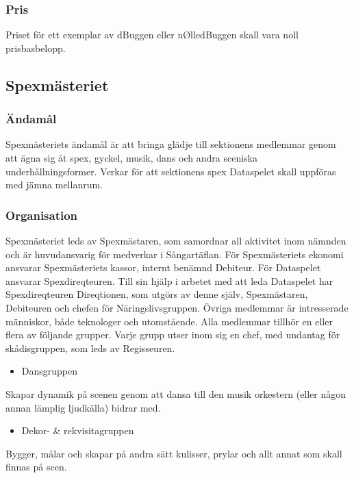 \documentclass[a4paper,12pt]{article}
\begin{document}
\subsubsection{Pris}

Priset för ett exemplar av dBuggen eller nØlledBuggen skall vara noll prisbasbelopp.

\subsection{Spexmästeriet}

\subsubsection{Ändamål}

Spexmästeriets ändamål är att bringa glädje till sektionens medlemmar genom att ägna sig åt spex, gyckel, musik, dans och andra sceniska underhållningsformer. Verkar för att sektionens spex Dataspelet skall uppföras med jämna mellanrum.

\subsubsection{Organisation}

Spexmästeriet leds av Spexmästaren, som samordnar all aktivitet inom nämnden och är huvudansvarig för medverkar i Sångartäflan. För Spexmästeriets ekonomi ansvarar Spexmästeriets kassor, internt benämnd Debiteur. För Dataspelet ansvarar Spexdireqteuren. Till sin hjälp i arbetet med att leda Dataspelet har Spexdireqteuren Direqtionen, som utgörs av denne själv, Spexmästaren, Debiteuren och chefen för Näringslivsgruppen. Övriga medlemmar är intresserade människor, både teknologer och utomstående. Alla medlemmar tillhör en eller flera av följande grupper. Varje grupp utser inom sig en chef, med undantag för skådisgruppen, som leds av Regisseuren.

\begin{itemize}
  \item Dansgruppen
\end{itemize}

Skapar dynamik på scenen genom att dansa till den musik orkestern (eller någon annan lämplig ljudkälla) bidrar med.

\begin{itemize}
  \item Dekor- \& rekvisitagruppen
\end{itemize}

Bygger, målar och skapar på andra sätt kulisser, prylar och allt annat som skall finnas på scen.
\end{document}
